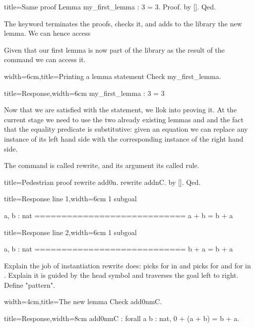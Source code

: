\begin{coq}{title=Same proof}
Lemma my_first_lemma : 3 = 3.
Proof. by []. Qed.
\end{coq}

The  keyword terminates the proofs, checks it, and adds to
the library the new lemma.  We can hence access

Given that our first lemma is now part of the library as the result
of the  command we can access it.

\begin{coq}{width=6cm,title=Printing a lemma statement}
Check my_first_lemma.
\end{coq}
\begin{coqout}{title=Response,width=6cm}
my_first_lemma : 3 = 3
\end{coqout}

Now that we are satisfied with the statement, we llok into proving it.
At the current stage we need to use the two already existing
lemmas  and  and the fact that the equality predicate
is substitutive: given an equation we can replace any instance of
its left hand side with the corresponding instance of the right hand side.

The command is called rewrite, and its argument its called rule.

\begin{coq}{title=Pedestrian proof}
rewrite add0n.
rewrite addnC.
by [].
Qed.
\end{coq}

\begin{coqout}{title=Response line 1,width=6cm}
1 subgoal

  a, b : nat
  ============================
   a + b = b + a
\end{coqout}
\begin{coqout}{title=Response line 2,width=6cm}
1 subgoal

  a, b : nat
  ============================
   b + a = b + a
\end{coqout}

Explain the job of instantiation rewrite does: picks  for
 in  and picks  for  and  for  in
.  Explain it is guided by the head symbol \C{+} and traverses
the goal left to right.  Define "pattern".

\begin{coq}{width=4cm,title=The new lemma}
Check add0nmC.
\end{coq}
\begin{coqout}{title=Response,width=8cm}
add0nmC : forall a b : nat, 0 + (a + b) = b + a.
\end{coqout}

